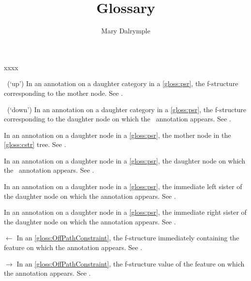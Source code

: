 \documentclass[output=paper,colorlinks,citecolor=brown]{langscibook}
\title{Glossary}
\author{Mary Dalrymple\affiliation{University of Oxford}}
\begin{document}
\maketitle
\label{chap:glossary}

\begin{labeling}{xxxx}
\sloppy

\item[\UP\ (`up')] In an annotation on a daughter category in a \ref{gloss:psr}, the f-structure corresponding to the mother node. See \citetv[\ref{sect:intro:annotated}]{chapters/Intro}.

\item[\DOWN\ (`down')] In an annotation on a daughter category in a \ref{gloss:psr}, the f-structure corresponding to the daughter node on which the \DOWN\ annotation appears. See \citetv[\ref{sect:intro:annotated}]{chapters/Intro}.

\item[\MSTAR] In an annotation on a daughter node in a \ref{gloss:psr}, the mother node in the \ref{gloss:cstr} tree. See \citetv[\ref{sect:intro:annotated}]{chapters/Intro}.

\item[\STAR] In an annotation on a daughter node in a \ref{gloss:psr}, the daughter node on which the \STAR\ annotation appears. See \citetv[\ref{sect:intro:annotated}]{chapters/Intro}.

\item[\LSTAR] In an annotation on a daughter node in a \ref{gloss:psr}, the immediate left sister of the daughter node on which the annotation appears. See \citetv[\ref{sec:CoreConcepts:Locality}]{chapters/CoreConcepts}.

\item[\RSTAR] In an annotation on a daughter node in a \ref{gloss:psr}, the immediate right sister of the daughter node on which the annotation appears. See \citetv[\ref{sec:CoreConcepts:Locality}]{chapters/CoreConcepts}.

\item[{$\leftarrow$}] In an \ref{gloss:OffPathConstraint}, the f-structure immediately containing the feature on which the annotation appears. See \citetv[\ref{sect:constequ}]{chapters/CoreConcepts}.

\item[{$\rightarrow$}] In an \ref{gloss:OffPathConstraint}, the f-structure value of the feature on which the annotation appears. See \citetv[\ref{sect:constequ}]{chapters/CoreConcepts}.


\end{labeling}
\end{document}
